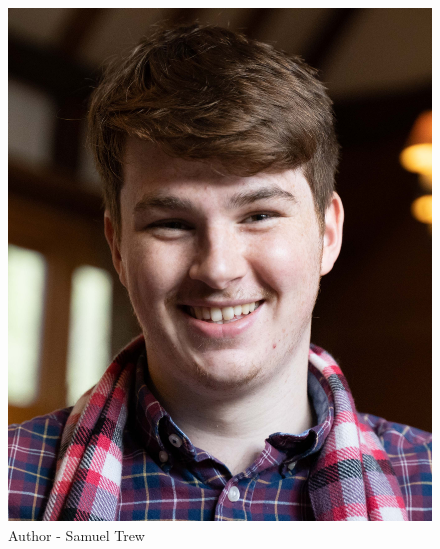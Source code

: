 \begin{figure}[htbp]
	\centering
    \includegraphics[scale=0.18]{appendices/sam.jpg}
    \caption{Author - Samuel Trew}
    \label{sam}
\end{figure}